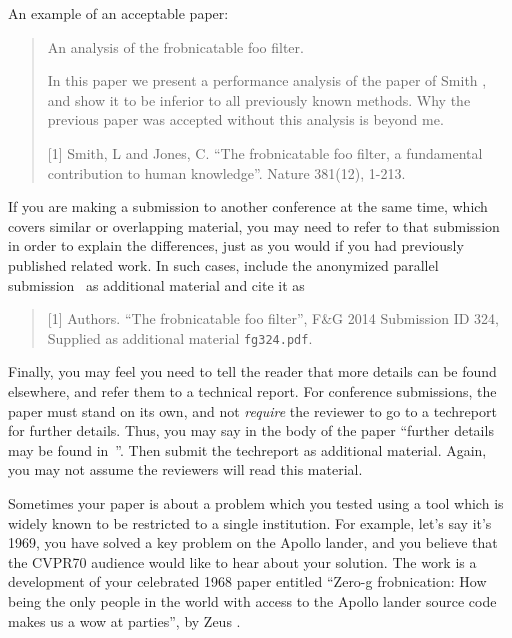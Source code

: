 \documentclass[10pt,twocolumn,letterpaper]{article}
\begin{document}
An example of an acceptable paper:

\begin{quote}
\begin{center}
     An analysis of the frobnicatable foo filter.
\end{center}

   In this paper we present a performance analysis of the
   paper of Smith \etal [1], and show it to be inferior to
   all previously known methods.  Why the previous paper
   was accepted without this analysis is beyond me.

   [1] Smith, L and Jones, C. ``The frobnicatable foo
   filter, a fundamental contribution to human knowledge''.
   Nature 381(12), 1-213.
\end{quote}

If you are making a submission to another conference at the same time,
which covers similar or overlapping material, you may need to refer to that
submission in order to explain the differences, just as you would if you
had previously published related work.  In such cases, include the
anonymized parallel submission~\cite{Authors14} as additional material and
cite it as
\begin{quote}
[1] Authors. ``The frobnicatable foo filter'', F\&G 2014 Submission ID 324,
Supplied as additional material {\tt fg324.pdf}.
\end{quote}

Finally, you may feel you need to tell the reader that more details can be
found elsewhere, and refer them to a technical report.  For conference
submissions, the paper must stand on its own, and not {\em require} the
reviewer to go to a techreport for further details.  Thus, you may say in
the body of the paper ``further details may be found
in~\cite{Authors14b}''.  Then submit the techreport as additional material.
Again, you may not assume the reviewers will read this material. 

Sometimes your paper is about a problem which you tested using a tool which
is widely known to be restricted to a single institution.  For example,
let's say it's 1969, you have solved a key problem on the Apollo lander,
and you believe that the CVPR70 audience would like to hear about your
solution.  The work is a development of your celebrated 1968 paper entitled
``Zero-g frobnication: How being the only people in the world with access to
the Apollo lander source code makes us a wow at parties'', by Zeus \etal.
\end{document}

